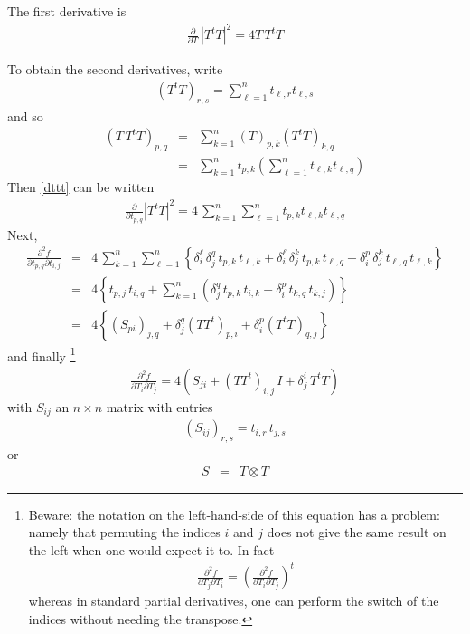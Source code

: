 \documentclass{report}
\begin{document}
\noindent The first derivative is
\begin{eqnarray}
\frac{\partial}{\partial T} \, |T^t T|^2 = 4 T \, T^t T \label{dttt}
\end{eqnarray}

\noindent To obtain the second derivatives, write
\begin{eqnarray}
\left( T^t T \right)_{r,s} = \sum_{\ell=1}^n t_{\ell,r} t_{\ell,s} 
\end{eqnarray}
and so
\begin{eqnarray}
\left( T \, T^t T \right)_{p,q} & = & \sum_{k=1}^n (T)_{p,k} \left( T^t T \right)_{k,q} \\
 & = & \sum_{k=1}^n t_{p,k} \left( \sum_{\ell=1}^n t_{\ell,k} t_{\ell,q} \right)
\end{eqnarray}
Then \ref{dttt} can be written
\begin{eqnarray}
\frac{\partial}{\partial t_{p,q}} |T^t T|^2 = 4 \, \sum_{k=1}^n \sum_{\ell=1}^n  t_{p,k} t_{\ell,k} t_{\ell,q} 
\end{eqnarray}
Next,
\begin{eqnarray} 
\frac{\partial^2 f}{\partial t_{p,q} \partial t_{i,j}} & = & 4\, \sum_{k=1}^n \sum_{\ell=1}^n  \left\{ \delta_i^\ell \, \delta_j^q \, t_{p,k} \, t_{\ell,k} + \delta_i^\ell \, \delta_j^k \, t_{p,k} \, t_{\ell,q} + \delta_i^p \, \delta_j^k \, t_{\ell,q} \, t_{\ell,k} \right\} \nonumber \\
 & = & 4 \left\{ t_{p,j} \, t_{i,q} + \sum_{k=1}^n \left( \delta_j^q \, t_{p,k} \, t_{i,k} + \delta_i^p \, t_{k,q} \, t_{k,j} \right) \right\} \\
& = & 4 \left\{ \left( S_{pi} \right)_{j,q} + \delta_j^q (T T^t)_{p,i} + \delta_i^p (T^t T)_{q,j}\right\}
\end{eqnarray}
and finally
\footnote{Beware: the notation on the left-hand-side of this equation has a problem: namely that permuting the indices $i$ and $j$ 
does not give the same result on the left when one would expect it to. In fact
\begin{eqnarray}
\frac{\partial^2 f}{\partial T_j \partial T_i} = \left( \frac{\partial^2 f}{\partial T_i \partial T_j} \right)^t
\end{eqnarray}
whereas in standard partial derivatives, one can perform the switch of the 
indices without needing the transpose.} 
\begin{eqnarray}
\label{hessttt}
\frac{\partial^2 f}{\partial T_i \partial T_j} = 4 \left( S_{ji} + (T T^t)_{i,j} \, I + \delta_j^i \, T^t T \right)
\end{eqnarray}
with $S_{ij}$ an $n \times n$ matrix with entries
\begin{eqnarray}
\left( S_{ij} \right)_{r,s} = t_{i,r} \, t_{j,s} \label{sij}
\end{eqnarray}
or 
\begin{eqnarray}
S &=& T \otimes T
\end{eqnarray}
\newline
\end{document}
